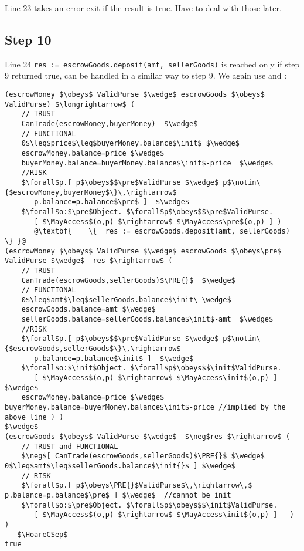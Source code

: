 Line 23 takes an error exit if the result is true.  Have to deal with those later.

\subsection{Step 10}

Line 24
%
\lstinline+res := escrowGoods.deposit(amt, sellerGoods)+
%
is reached only if step 9 returned true, can be handled in a similar
way to step 9. We again use  and :

\begin{lstlisting}[escapechar=@]
(escrowMoney $\obeys$ ValidPurse $\wedge$ escrowGoods $\obeys$ ValidPurse) $\longrightarrow$ (
    // TRUST
    CanTrade(escrowMoney,buyerMoney)  $\wedge$
    // FUNCTIONAL
    0$\leq$price$\leq$buyerMoney.balance$\init$ $\wedge$
    escrowMoney.balance=price $\wedge$
    buyerMoney.balance=buyerMoney.balance$\init$-price  $\wedge$
    //RISK
    $\forall$p.[ p$\obeys$$\pre$ValidPurse $\wedge$ p$\notin\{$escrowMoney,buyerMoney$\}\,\rightarrow$
       p.balance=p.balance$\pre$ ]  $\wedge$
    $\forall$o:$\pre$Object. $\forall$p$\obeys$$\pre$ValidPurse.
       [ $\MayAccess$(o,p) $\rightarrow$ $\MayAccess\pre$(o,p) ] )
       @\textbf{    \{  res := escrowGoods.deposit(amt, sellerGoods) \} }@
(escrowMoney $\obeys$ ValidPurse $\wedge$ escrowGoods $\obeys\pre$ ValidPurse $\wedge$  res $\rightarrow$ (
    // TRUST
    CanTrade(escrowGoods,sellerGoods)$\PRE{}$  $\wedge$
    // FUNCTIONAL
    0$\leq$amt$\leq$sellerGoods.balance$\init\ \wedge$
    escrowGoods.balance=amt $\wedge$
    sellerGoods.balance=sellerGoods.balance$\init$-amt  $\wedge$
    //RISK
    $\forall$p.[ p$\obeys$$\pre$ValidPurse $\wedge$ p$\notin\{$escrowGoods,sellerGoods$\}\,\rightarrow$
       p.balance=p.balance$\init$ ]  $\wedge$
    $\forall$o:$\init$Object. $\forall$p$\obeys$$\init$ValidPurse.
       [ $\MayAccess$(o,p) $\rightarrow$ $\MayAccess\init$(o,p) ]    $\wedge$
    escrowMoney.balance=price $\wedge$  buyerMoney.balance=buyerMoney.balance$\init$-price //implied by the above line ) )
$\wedge$
(escrowGoods $\obeys$ ValidPurse $\wedge$  $\neg$res $\rightarrow$ (
    // TRUST and FUNCTIONAL
    $\neg$[ CanTrade(escrowGoods,sellerGoods)$\PRE{}$ $\wedge$ 0$\leq$amt$\leq$sellerGoods.balance$\init{}$ ] $\wedge$
    // RISK
    $\forall$p.[ p$\obeys\PRE{}$ValidPurse$\,\rightarrow\,$ p.balance=p.balance$\pre$ ] $\wedge$  //cannot be init
    $\forall$o:$\pre$Object. $\forall$p$\obeys$$\init$ValidPurse.
       [ $\MayAccess$(o,p) $\rightarrow$ $\MayAccess\init$(o,p) ]   ) )
   $\HoareCSep$
true
\end{lstlisting}


